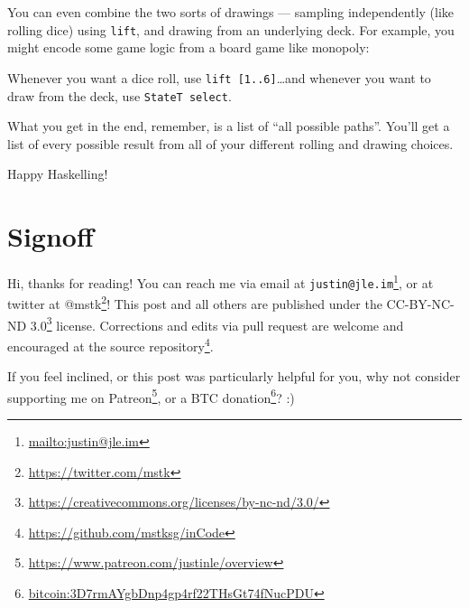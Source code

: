 \documentclass[]{article}
\newenvironment{Shaded}{}{}
\newcommand{\DataTypeTok}[1]{\textcolor[rgb]{0.56,0.13,0.00}{#1}}
\newcommand{\DecValTok}[1]{\textcolor[rgb]{0.25,0.63,0.44}{#1}}
\newcommand{\FunctionTok}[1]{\textcolor[rgb]{0.02,0.16,0.49}{#1}}
\newcommand{\KeywordTok}[1]{\textcolor[rgb]{0.00,0.44,0.13}{\textbf{#1}}}
\newcommand{\NormalTok}[1]{#1}
\newcommand{\OperatorTok}[1]{\textcolor[rgb]{0.40,0.40,0.40}{#1}}
\newcommand{\OtherTok}[1]{\textcolor[rgb]{0.00,0.44,0.13}{#1}}
\renewcommand{\href}[2]{#2\footnote{\url{#1}}}
\begin{document}
You can even combine the two sorts of drawings --- sampling independently (like
rolling dice) using \texttt{lift}, and drawing from an underlying deck. For
example, you might encode some game logic from a board game like monopoly:

\begin{Shaded}
\end{Shaded}

Whenever you want a dice roll, use \texttt{lift\ {[}1..6{]}}\ldots and whenever
you want to draw from the deck, use \texttt{StateT\ select}.

What you get in the end, remember, is a list of ``all possible paths''. You'll
get a list of every possible result from all of your different rolling and
drawing choices.

Happy Haskelling!

\section{Signoff}\label{signoff}

Hi, thanks for reading! You can reach me via email at
\href{mailto:justin@jle.im}{\nolinkurl{justin@jle.im}}, or at twitter at
\href{https://twitter.com/mstk}{@mstk}! This post and all others are published
under the \href{https://creativecommons.org/licenses/by-nc-nd/3.0/}{CC-BY-NC-ND
3.0} license. Corrections and edits via pull request are welcome and encouraged
at \href{https://github.com/mstksg/inCode}{the source repository}.

If you feel inclined, or this post was particularly helpful for you, why not
consider \href{https://www.patreon.com/justinle/overview}{supporting me on
Patreon}, or a \href{bitcoin:3D7rmAYgbDnp4gp4rf22THsGt74fNucPDU}{BTC donation}?
:)
\end{document}
